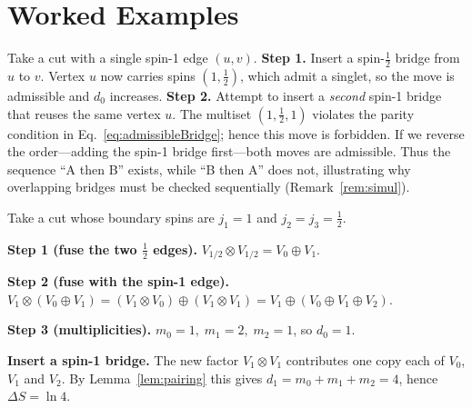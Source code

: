 \documentclass[11pt]{article}
\begin{document}

\section{Worked Examples}

\begin{example}\label{ex:overlap}
Take a cut with a single spin-1 edge $(u,v)$.
\textbf{Step 1.} Insert a spin-$\tfrac12$ bridge from $u$ to $v$.
Vertex $u$ now carries spins $(1,\tfrac12)$, which admit a singlet, so the move is admissible and $d_0$ increases.
\textbf{Step 2.} Attempt to insert a \emph{second} spin-1 bridge that reuses the same vertex $u$.
The multiset $(1,\tfrac12,1)$ violates the parity condition in Eq.~\eqref{eq:admissibleBridge}; hence this move is forbidden.
If we reverse the order—adding the spin-1 bridge first—both moves are admissible. 
Thus the sequence “A then B” exists, while “B then A” does not, illustrating why overlapping bridges must be checked sequentially (Remark~\ref{rem:simul}).

\end{example}

\begin{example}\label{ex:mixed}
Take a cut whose boundary spins are \(j_1=1\) and \(j_2=j_3=\tfrac12\).

\textbf{Step 1 (fuse the two \(\tfrac12\) edges).} \(V_{1/2}\otimes V_{1/2}=V_0\oplus V_1\).

\textbf{Step 2 (fuse with the spin-1 edge).} \(V_1\otimes(V_0\oplus V_1)=(V_1\otimes V_0)\oplus(V_1\otimes V_1)=V_1\oplus(V_0\oplus V_1\oplus V_2)\).

\textbf{Step 3 (multiplicities).} \(m_0=1,\; m_1=2,\; m_2=1\), so \(d_0=1\).

\textbf{Insert a spin-1 bridge.} 
The new factor \(V_1\otimes V_1\) contributes one copy each of
\(V_0\), \(V_1\) and \(V_2\).
By Lemma~\ref{lem:pairing} this gives
\(d_1=m_0+m_1+m_2=4\), hence \(\Delta S=\ln 4\).


\end{example}
\end{document}

